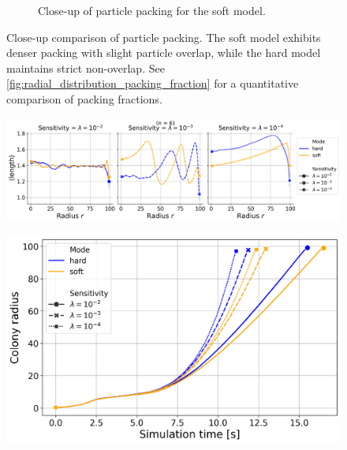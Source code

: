 \documentclass[conference]{IEEEtran}
\begin{document}
\begin{figure}[H]
\begin{subfigure}[b]{0.49\columnwidth}
        \caption{Close-up of particle packing for the soft model.}
        \label{fig:packing_soft}
    \end{subfigure}
    \caption{Close-up comparison of particle packing. The soft model exhibits denser packing with slight particle overlap, while the hard model maintains strict non-overlap. See \autoref{fig:radial_distribution_packing_fraction} for a quantitative comparison of packing fractions.}
    \label{fig:dense_packing_comparison}
\end{figure}


\begin{figure}[h]
    \centering
    \includegraphics[width=\linewidth]{figures/comparison_plots/combined_length_shared.png}

    \caption{ }
\end{figure}


\begin{figure}[h]
    \centering
    \includegraphics[width=\linewidth]{figures/comparison_plots/combined_simulation_time [s]_vs_colony_radius.png}
    \caption{ }
\end{figure}

\newpage
\end{document}

